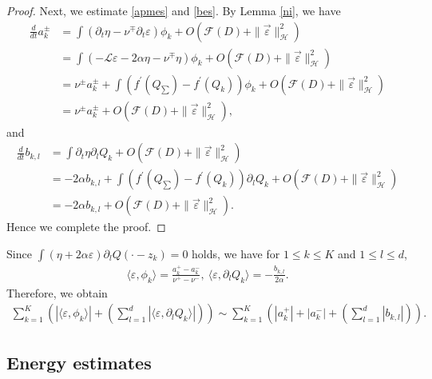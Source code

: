 \documentclass[reqno]{amsart}
\theoremstyle{plain}
\theoremstyle{definition}
\numberwithin{equation}{section}
\newcommand{\1}{\mathbbm{1}}
\begin{document}
\begin{proof}
Next, we estimate \eqref{apmes} and \eqref{bes}. By Lemma \ref{ni}, we have
\begin{align*}
\frac{d}{dt}a_k^{\pm}&=\int ({\partial}_t\eta-\nu^{\mp}{\partial}_t\varepsilon)\phi_k+O(\mathcal{F}(D)+\|\vec{\varepsilon}\|_{\mathcal{H}}^2)
\\
&=\int(-\mathcal{L}\varepsilon-2\alpha \eta-\nu^{\mp}\eta)\phi_k+O(\mathcal{F}(D)+\|\vec{\varepsilon}\|_{\mathcal{H}}^2)
\\
&=\nu^{\pm}a_k^{\pm}+\int (f^{\prime}(Q_{\sum})-f^{\prime}(Q_k))\phi_k+O(\mathcal{F}(D)+\|\vec{\varepsilon}\|_{\mathcal{H}}^2)
\\
&=\nu^{\pm}a_k^{\pm}+O(\mathcal{F}(D)+\|\vec{\varepsilon}\|_{\mathcal{H}}^2),
\end{align*}
and
\begin{align*}
\frac{d}{dt}b_{k,l}&=\int {\partial}_t\eta {\partial}_lQ_k+O(\mathcal{F}(D)+\|\vec{\varepsilon}\|_{\mathcal{H}}^2)
\\
&=-2\alpha b_{k,l}+\int (f^{\prime}(Q_{\sum})-f^{\prime}(Q_k)){\partial}_lQ_k+O(\mathcal{F}(D)+\|\vec{\varepsilon}\|_{\mathcal{H}}^2)
\\
&=-2\alpha b_{k,l}+O(\mathcal{F}(D)+\|\vec{\varepsilon}\|_{\mathcal{H}}^2).
\end{align*}
Hence we complete the proof.
\end{proof}
Since $\int (\eta+2\alpha\varepsilon){\partial}_lQ(\cdot-z_k)=0$ holds, we have for $1\leq k\leq K$ and $1\leq l\leq d$,
\begin{align*}
\langle \varepsilon, \phi_k \rangle=\frac{a_k^+-a_k^-}{\nu^+-\nu^-},\ \langle \varepsilon,{\partial}_lQ_k\rangle= -\frac{b_{k,l}}{2\alpha}.
\end{align*}
Therefore, we obtain
\begin{align}\label{coersim}
\sum_{k=1}^K\left(|\langle \varepsilon,\phi_k\rangle|+\left(\sum_{l=1}^d|\langle \varepsilon,{\partial}_lQ_k\rangle|\right) \right)\sim \sum_{k=1}^K\left( |a_k^+|+|a_k^-|+\left(\sum_{l=1}^d|b_{k,l}|\right)\right).
\end{align}




\subsection{Energy estimates}
\end{document}
